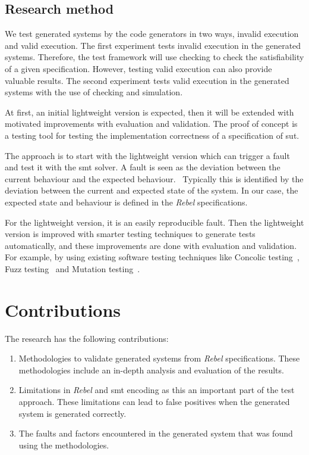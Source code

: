 \subsection{Research method}\label{sec:research-method}
We test generated systems by the code generators in two ways, invalid execution
and valid execution. The first experiment tests invalid execution in the
generated systems. Therefore, the test framework will use checking to check the
satisfiability of a given specification. However, testing valid execution can
also provide valuable results. The second experiment tests valid execution in
the generated systems with the use of checking and simulation.

At first, an initial lightweight version is expected, then it will be extended with motivated
improvements with evaluation and validation. The proof of concept is a testing
tool for testing the implementation correctness of a specification of \gls{sut}.

The
approach is to start with the lightweight version which can trigger a fault and
test it with the \gls{smt} solver. A fault is seen as the deviation between the
current behaviour and the expected behaviour.~\cite{delgado2004taxonomy, leucker2009brief}
Typically this is identified by the deviation between the current and expected
state of the system. In our case, the expected state and behaviour is defined in
the \textit{Rebel} specifications.

For the lightweight version, it is an easily
reproducible fault. Then the lightweight version is improved with smarter
testing techniques to generate tests automatically, and these improvements are done
with evaluation and validation. For example, by using existing software testing
techniques like Concolic testing~\cite{sen2007concolic},
Fuzz testing~\cite{godefroid2008automated} and Mutation testing~\cite{jia2011analysis}.

\section{Contributions}
The research has the following contributions:

\begin{enumerate}
  \item Methodologies to validate generated systems from \textit{Rebel}
  specifications. These methodologies include an in-depth analysis and
  evaluation of the results.

  \item Limitations in \textit{Rebel} and \gls{smt} encoding as this an
  important part of the test approach. These limitations can lead to false
  positives when the generated system is generated correctly.

  \item The faults and factors encountered in the generated system that was found
  using the methodologies.
\end{enumerate}

